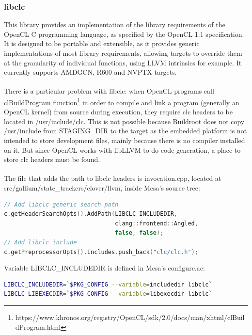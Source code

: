 \documentclass[12pt,a4paper,oneside]{article}
\begin{document}
\subsubsection*{libclc}
This library provides an implementation of the library requirements of the
OpenCL C programming language, as specified by the OpenCL 1.1 specification.
It is designed to be portable and extensible, as it provides generic
implementations of most library requirements, allowing targets to override them
at the granularity of individual functions, using LLVM intrinsics for example.
It currently supports AMDGCN, R600 and NVPTX targets.\\\\
There is a particular problem with libclc: when OpenCL programs call clBuildProgram
function\footnote{https://www.khronos.org/registry/OpenCL/sdk/2.0/docs/man/xhtml/clBuildProgram.html}
in order to compile and link a program (generally an OpenCL kernel) from source
during execution, they require clc headers to be located in /usr/include/clc.
This is not possible because Buildroot does not copy /usr/include from STAGING\_DIR
to the target as the embedded platform is not intended to store development files,
mainly because there is no compiler installed on it. But since OpenCL works with
libLLVM to do code generation, a place to store clc headers must be found.\\\\
The file that adds the path to libclc headers is invocation.cpp, located at
src/gallium/state\_trackers/clover/llvm, inside Mesa's source tree:\\

\begin{lstlisting}[language=C++,caption={Extract from invocation.cpp},captionpos=b]
// Add libclc generic search path
c.getHeaderSearchOpts().AddPath(LIBCLC_INCLUDEDIR,
                                clang::frontend::Angled,
                                false, false);
// Add libclc include
c.getPreprocessorOpts().Includes.push_back("clc/clc.h");
\end{lstlisting}

Variable LIBCLC\_INCLUDEDIR is defined in Mesa's configure.ac:\\

\begin{lstlisting}[language=sh,caption={Extract from configure.ac},captionpos=b]
LIBCLC_INCLUDEDIR=`$PKG_CONFIG --variable=includedir libclc`
LIBCLC_LIBEXECDIR=`$PKG_CONFIG --variable=libexecdir libclc`
\end{lstlisting}
\end{document}

